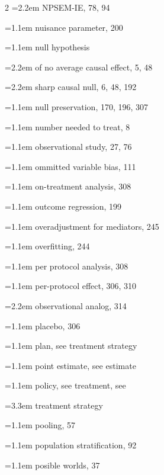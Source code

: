 \begin{multicols}{2}
\hspace*{1.1em}\hangindent=2.2em NPSEM-IE, 78, 94\par
\hangindent=1.1em nuisance parameter, 200\par
\hangindent=1.1em null hypothesis\par
\hspace*{1.1em}\hangindent=2.2em of no average causal effect, 5, 48\par
\hspace*{1.1em}\hangindent=2.2em sharp causal null, 6, 48, 192\par
\hangindent=1.1em null preservation, 170, 196, 307\par
\hangindent=1.1em number needed to treat, 8\par
\hangindent=1.1em observational study, 27, 76\par
\hangindent=1.1em ommitted variable bias, 111\par
\hangindent=1.1em on-treatment analysis, 308\par
\hangindent=1.1em outcome regression, 199\par
\hangindent=1.1em overadjustment for mediators, 245\par
\hangindent=1.1em overfitting, 244\par
\hangindent=1.1em per protocol analysis, 308\par
\hangindent=1.1em per-protocol effect, 306, 310\par
\hspace*{1.1em}\hangindent=2.2em observational analog, 314\par
\hangindent=1.1em placebo, 306\par
\hangindent=1.1em plan, see treatment strategy\par
\hangindent=1.1em point estimate, see estimate\par
\hangindent=1.1em policy, see treatment, see\par
\hspace*{2.2em}\hangindent=3.3em treatment strategy\par
\hangindent=1.1em pooling, 57\par
\hangindent=1.1em population stratification, 92\par
\hangindent=1.1em posible worlds, 37\par

\end{multicols}

